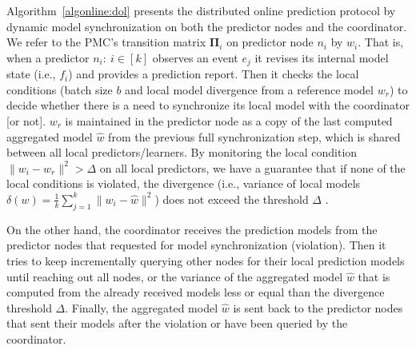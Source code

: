 \par Algorithm~\ref{algonline:dol} presents the distributed online prediction protocol by dynamic model synchronization on both the predictor nodes and the coordinator. We refer to the PMC's transition matrix $\boldsymbol{\Pi}_i$ on predictor node $n_i$ by $w_i$. That is, when a predictor $n_i:\ i \in[k]$ observes an event $e_j$ it revises its internal model state (i.e., $f_i$) and provides a prediction report. Then it checks the local conditions  (batch size $b$ and local model divergence from a reference model $w_r$) to decide whether there is a need to synchronize its local model with the coordinator [or not].  $w_r$ is maintained in the predictor node as a copy of the last computed aggregated model $\hat{w}$ from the previous full synchronization step, which is shared between all local predictors/learners. By monitoring the local condition $\|w_i - w_r\|^2 > \Delta$ on all local predictors, we have a guarantee that if none of the local conditions is violated, the divergence (i.e., variance of local models $\delta(w)=\frac{1}{k} \sum_{j=1}^{k}\|w_i - \hat{w}\|^2$) does not exceed the threshold $\Delta$ \cite{kamp2014communication}. 

\par On the other hand, the coordinator receives the prediction models from the predictor nodes that requested for model synchronization (violation). Then it tries to keep incrementally querying other nodes for their local prediction models until reaching out all nodes, or the variance of the aggregated model $\hat{w}$ that is computed from the already received models less or equal than the divergence threshold  $\Delta$. Finally, the aggregated model $\hat{w}$ is sent back to the predictor nodes that sent their models after the violation or have been queried by the coordinator.

